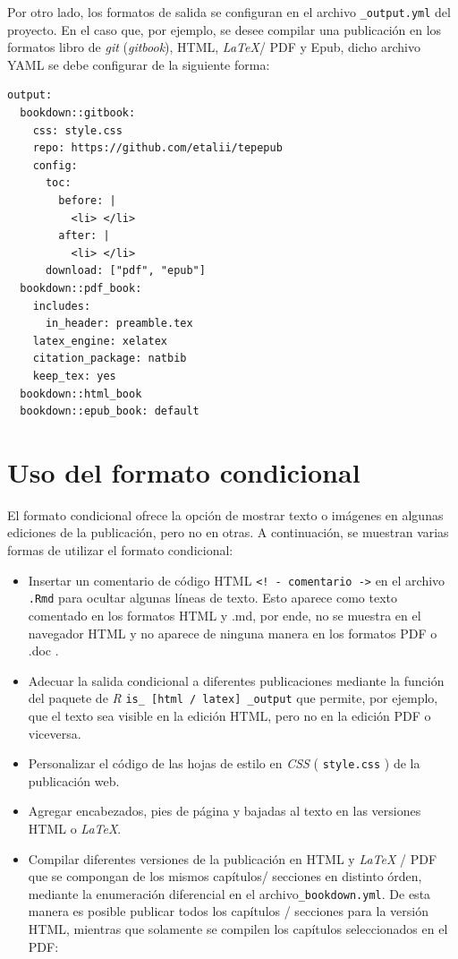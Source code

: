 \documentclass[
]{krantz}
\begin{document}
Por otro lado, los formatos de salida se configuran en el archivo \texttt{\_output.yml} del proyecto. En el caso que, por ejemplo, se desee compilar una publicación en los formatos libro de \emph{git} (\emph{gitbook}), HTML, \emph{LaTeX}/ PDF y Epub, dicho archivo YAML se debe configurar de la siguiente forma:

\begin{verbatim}
output:
  bookdown::gitbook:
    css: style.css
    repo: https://github.com/etalii/tepepub
    config:
      toc:
        before: |
          <li> </li>
        after: |
          <li> </li>
      download: ["pdf", "epub"]
  bookdown::pdf_book:
    includes:
      in_header: preamble.tex
    latex_engine: xelatex
    citation_package: natbib
    keep_tex: yes
  bookdown::html_book
  bookdown::epub_book: default
\end{verbatim}

\hypertarget{uso-del-formato-condicional}{%
\section{Uso del formato condicional}\label{uso-del-formato-condicional}}

El formato condicional ofrece la opción de mostrar texto o imágenes en algunas ediciones de la publicación, pero no en otras. A continuación, se muestran varias formas de utilizar el formato condicional:

\begin{itemize}
\item
  Insertar un comentario de código HTML \texttt{\textless{}!\ -\ comentario\ -\textgreater{}} en el archivo \texttt{.Rmd} para ocultar algunas líneas de texto. Esto aparece como texto comentado en los formatos HTML y .md, por ende, no se muestra en el navegador HTML y no aparece de ninguna manera en los formatos PDF o .doc .
\item
  Adecuar la salida condicional a diferentes publicaciones mediante la función del paquete de \emph{R} \texttt{is\_\ {[}html\ /\ latex{]}\ \_output} que permite, por ejemplo, que el texto sea visible en la edición HTML, pero no en la edición PDF o viceversa.
\item
  Personalizar el código de las hojas de estilo en \emph{CSS} ( \texttt{style.css} ) de la publicación web.
\item
  Agregar encabezados, pies de página y bajadas al texto en las versiones HTML o \emph{LaTeX}.
\item
  Compilar diferentes versiones de la publicación en HTML y \emph{LaTeX} / PDF que se compongan de los mismos capítulos/ secciones en distinto órden, mediante la enumeración diferencial en el archivo\texttt{\_bookdown.yml}. De esta manera es posible publicar todos los capítulos / secciones para la versión HTML, mientras que solamente se compilen los capítulos seleccionados en el PDF:
\end{itemize}
\end{document}
